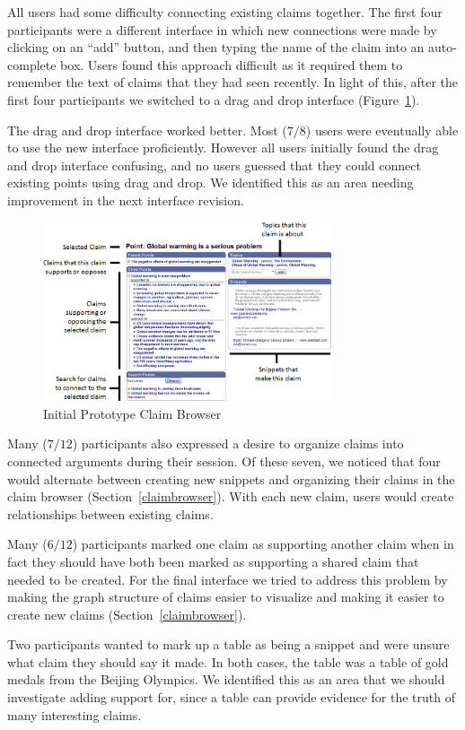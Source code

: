 \documentclass{chi2009}
\begin{document}
All users had some difficulty connecting existing claims together. The first four participants were a different interface in which new connections were made by clicking on an ``add'' button, and then typing the name of the claim into an auto-complete box. Users found this approach difficult as it required them to remember the text of claims that they had seen recently. In light of this, after the first four participants we switched to a drag and drop interface (Figure~\ref{oldbrowser}).

The drag and drop interface worked better. Most ($7/8$) users were eventually able to use the new interface proficiently. However all users initially found the drag and drop interface confusing, and no users guessed that they could connect existing points using drag and drop. We identified this as an area needing improvement in the next interface revision.


\begin{figure}[ht]
	\includegraphics[width=8.5cm]{../screenshots/oldpoint_diagram.png}
	\caption{Initial Prototype Claim Browser}
	\label{oldbrowser}
\end{figure}

Many ($7/12$) participants also expressed a desire to organize claims into connected arguments during their session. Of these seven, we noticed that four would alternate between creating new snippets and organizing their claims in the claim browser (Section~\ref{claimbrowser}). With each new claim, users would create relationships between existing claims.

Many ($6/12$) participants marked one claim as supporting another claim when in fact they should have both been marked as supporting a shared claim that needed to be created. For the final interface we tried to address this problem by making the graph structure of claims easier to visualize and making it easier to create new claims (Section~\ref{claimbrowser}).

Two participants wanted to mark up a table as being a snippet and were unsure what claim they should say it made. In both cases, the table was a table of gold medals from the Beijing Olympics. We identified this as an area that we should investigate adding support for, since a table can provide evidence for the truth of many interesting claims.
\end{document}
